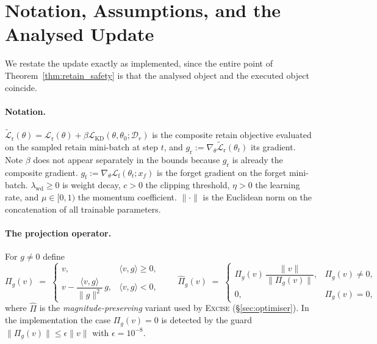 \documentclass{article}
\newcommand{\ours}{\textsc{Excise}}
\newcommand{\Dr}{\mathcal{D}_r}
\newcommand{\gf}{g_{\mathrm{f}}}
\newcommand{\gr}{g_{\mathrm{r}}}
\newcommand{\lossf}{\mathcal{L}_{\mathrm{f}}}
\newcommand{\lossr}{\mathcal{L}_{\mathrm{r}}}
\newcommand{\losskd}{\mathcal{L}_{\mathrm{KD}}}
\newcommand{\Lrt}{\widetilde{\mathcal{L}}_{\mathrm{r}}}
\theoremstyle{remark}
\theoremstyle{plain}
\begin{document}
\section{Notation, Assumptions, and the Analysed Update}\label{app:setup}

We restate the update exactly as implemented, since the entire point of
Theorem~\ref{thm:retain_safety} is that the analysed object and the executed
object coincide.

\paragraph{Notation.}
$\Lrt(\theta) = \lossr(\theta) + \beta\losskd(\theta,\theta_0;\Dr)$ is the
composite retain objective evaluated on the sampled retain mini-batch at step
$t$, and $\gr := \nabla_\theta\Lrt(\theta_t)$ its gradient. Note $\beta$ does not
appear separately in the bounds because $\gr$ is already the composite gradient.
$\gf := \nabla_\theta\lossf(\theta_t;x_f)$ is the forget gradient on the forget
mini-batch. $\lambda_{\mathrm{wd}} \ge 0$ is weight decay, $c>0$ the clipping
threshold, $\eta>0$ the learning rate, and $\mu\in[0,1)$ the momentum
coefficient. $\|\cdot\|$ is the Euclidean norm on the concatenation of all
trainable parameters.

\paragraph{The projection operator.}
For $g \ne 0$ define
\begin{equation}\label{eq:app_proj}
\Pi_{g}(v) \;=\;
\begin{cases}
v, & \langle v,g\rangle \ge 0,\\[2pt]
v - \dfrac{\langle v,g\rangle}{\|g\|^{2}}\,g, & \langle v,g\rangle < 0,
\end{cases}
\qquad
\widehat{\Pi}_{g}(v) \;=\;
\begin{cases}
\Pi_g(v)\,\dfrac{\|v\|}{\|\Pi_g(v)\|}, & \Pi_g(v) \ne 0,\\[4pt]
0, & \Pi_g(v) = 0,
\end{cases}
\end{equation}
where $\widehat{\Pi}$ is the \emph{magnitude-preserving} variant used by \ours{}
(\S\ref{sec:optimiser}). In the implementation the case $\Pi_g(v)=0$ is detected
by the guard $\|\Pi_g(v)\| \le \epsilon\|v\|$ with $\epsilon = 10^{-8}$.
\end{document}
